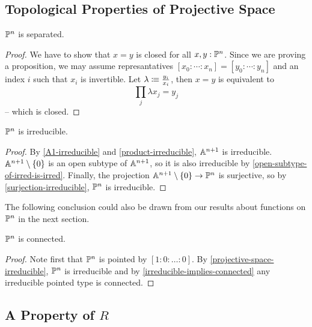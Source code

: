 
\subsection{Topological Properties of Projective Space}

\begin{proposition}
  \label{projective-space-separated}
  $\mathbb{P}^n$ is separated.
\end{proposition}

\begin{proof}
  We have to show that $x=y$ is closed for all $x,y:\mathbb{P}^n$.
  Since we are proving a proposition, we may assume represantatives
  $[x_0:\cdots:x_n]=[y_0:\cdots:y_n]$ and an index $i$ such that $x_i$ is invertible.
  Let $\lambda\vcentcolon\mspace{-1.2mu}\equiv \frac{y_i}{x_i}$, then $x=y$ is equivalent to
  \[
    \prod_j \lambda x_j=y_j
  \]
  -- which is closed.
\end{proof}

\begin{proposition}%
  \label{projective-space-irreducible}
  $\mathbb{P}^n$ is irreducible.
\end{proposition}

\begin{proof}
  By \cref{A1-irreducible} and \cref{product-irreducible}, $\mathbb{A}^{n+1}$ is irreducible.
  $\mathbb{A}^{n+1}\setminus\{0\}$ is an open subtype of $\mathbb{A}^{n+1}$,
  so it is also irreducible by \cref{open-subtype-of-irred-is-irred}.
  Finally, the projection $\mathbb{A}^{n+1}\setminus\{0\}\to\mathbb{P}^n$ is surjective,
  so by \cref{surjection-irreducible}, $\mathbb{P}^n$ is irreducible.
\end{proof}

The following conclusion could also be drawn from our results about functions on $\mathbb{P}^n$ in the next section.

\begin{corollary}%
  \label{projective-space-connected}
  $\mathbb{P}^n$ is connected.
\end{corollary}

\begin{proof}
  Note first that $\mathbb{P}^n$ is pointed by $[1:0:\dots:0]$.
  By \cref{projective-space-irreducible}, $\mathbb{P}^n$ is irreducible and
  by \cref{irreducible-implies-connected} any irreducible pointed type is connected.
\end{proof}


\subsection{A Property of $R$}

